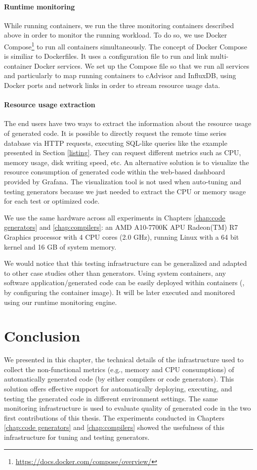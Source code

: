 \paragraph{Runtime monitoring}
While running containers, we run the three monitoring containers described above in order to monitor the running workload. To do so, we use Docker Compose\footnote{\url{https://docs.docker.com/compose/overview/}} to run all containers simultaneously. The concept of Docker Compose is similiar to Dockerfiles. It uses a configuration file to run and link multi-container Docker services. We set up the Compose file so that we run all services and particularly to map running containers to cAdvisor and InfluxDB, using Docker ports and network links in order to stream resource usage data.

\paragraph{Resource usage extraction}
The end users have two ways to extract the information about the resource usage of generated code. It is possible to directly request the remote time series database via HTTP requests, executing SQL-like queries like the example presented in Section \ref{listing}. They can request different metrics such as CPU, memory usage, disk writing speed, etc. An alternative solution is to visualize the resource consumption of generated code within the web-based dashboard provided by Grafana. The visualization tool is not used when auto-tuning and testing generators because we just needed to extract the CPU or memory usage for each test or optimized code. 

We use the same hardware across all experiments in Chapters \ref{chap:code generators} and \ref{chap:compilers}: an AMD A10-7700K APU Radeon(TM) R7 Graphics processor with 4 CPU cores (2.0 GHz), running Linux with a 64 bit kernel and 16 GB of system memory. 


\begin{remark}
	We would notice that this testing infrastructure can be generalized and adapted to other case studies other than generators. Using system containers, any software application/generated code can be easily deployed within containers (\ie, by configuring the container image). It will be later executed and monitored using our runtime monitoring engine. 
\end{remark}

\section{Conclusion}
\label{mon:coclusion}
We presented in this chapter, the technical details of the infrastructure used to collect the non-functional metrics (e.g., memory and CPU consumptions) of automatically generated code (by either compilers or code generators). This solution offers effective support for automatically deploying, executing, and testing the generated code in different environment settings.
The same monitoring infrastructure is used to evaluate quality of generated code in the two first contributions of this thesis. The experiments conducted in Chapters \ref{chap:code generators} and \ref{chap:compilers} showed the usefulness of this infrastructure for tuning and testing generators.